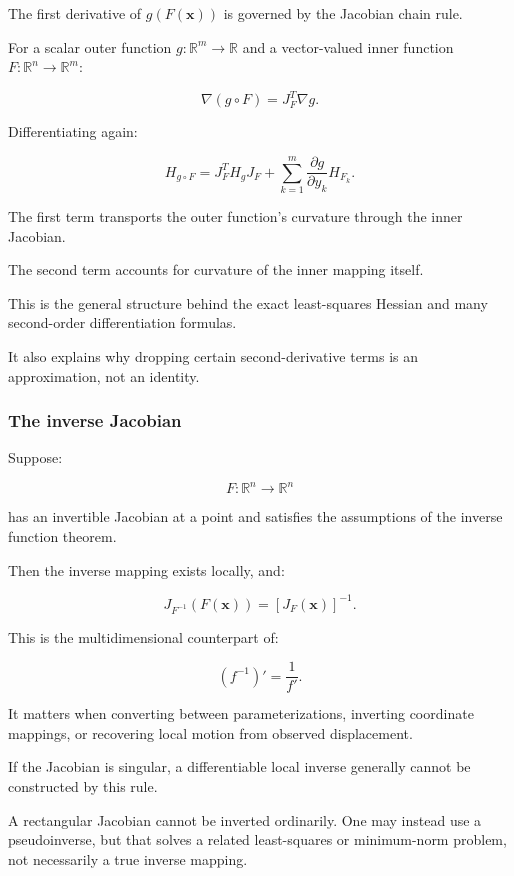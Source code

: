 The first derivative of \(g(F(\mathbf x))\) is governed by the Jacobian chain rule.

For a scalar outer function \(g:\mathbb R^m\to\mathbb R\) and a vector-valued inner function \(F:\mathbb R^n\to\mathbb R^m\):

\[
\nabla(g\circ F)=J_F^T\nabla g.
\]

Differentiating again:

\[
\boxed{ H_{g\circ F} = J_F^TH_gJ_F + \sum_{k=1}^{m} \frac{\partial g}{\partial y_k}H_{F_k} }.
\]

The first term transports the outer function's curvature through the inner Jacobian.

The second term accounts for curvature of the inner mapping itself.

This is the general structure behind the exact least-squares Hessian and many second-order differentiation formulas.

It also explains why dropping certain second-derivative terms is an approximation, not an identity.

\subsubsection{The inverse Jacobian}\label{02-foundations-ii-ch021-the-inverse-jacobian}

\hypertarget{02-foundations-ii-ch021-the-inverse-jacobian}{}

Suppose:

\[
F:\mathbb R^n\to\mathbb R^n
\]

has an invertible Jacobian at a point and satisfies the assumptions of the inverse function theorem.

Then the inverse mapping exists locally, and:

\[
\boxed{ J_{F^{-1}}(F(\mathbf x))= [J_F(\mathbf x)]^{-1} }.
\]

This is the multidimensional counterpart of:

\[
(f^{-1})'=\frac1{f'}.
\]

It matters when converting between parameterizations, inverting coordinate mappings, or recovering local motion from observed displacement.

If the Jacobian is singular, a differentiable local inverse generally cannot be constructed by this rule.

A rectangular Jacobian cannot be inverted ordinarily. One may instead use a pseudoinverse, but that solves a related least-squares or minimum-norm problem, not necessarily a true inverse mapping.

